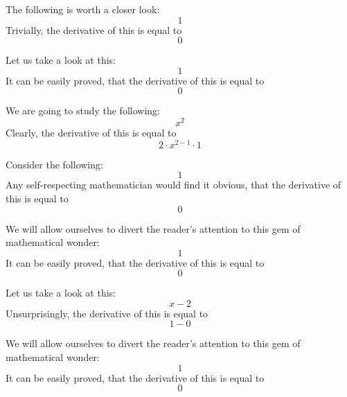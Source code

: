 \documentclass{article}
\begin{document}
The following is worth a closer look:
\begin{equation}
1 
\end{equation}
Trivially, the derivative of this is equal to
\begin{equation}
0 
\end{equation}

Let us take a look at this:
\begin{equation}
1 
\end{equation}
It can be easily proved, that the derivative of this is equal to
\begin{equation}
0 
\end{equation}

We are going to study the following:
\begin{equation}
x ^{2 } 
\end{equation}
Clearly, the derivative of this is equal to
\begin{equation}
2 \cdot x ^{2 - 1 } \cdot 1 
\end{equation}

Consider the following:
\begin{equation}
1 
\end{equation}
Any self-respecting mathematician would find it obvious, that the derivative of this is equal to
\begin{equation}
0 
\end{equation}

We will allow ourselves to divert the reader's attention to this gem of mathematical wonder:
\begin{equation}
1 
\end{equation}
It can be easily proved, that the derivative of this is equal to
\begin{equation}
0 
\end{equation}

Let us take a look at this:
\begin{equation}
x - 2 
\end{equation}
Unsurprisingly, the derivative of this is equal to
\begin{equation}
1 - 0 
\end{equation}

We will allow ourselves to divert the reader's attention to this gem of mathematical wonder:
\begin{equation}
1 
\end{equation}
It can be easily proved, that the derivative of this is equal to
\begin{equation}
0 
\end{equation}
\end{document}
